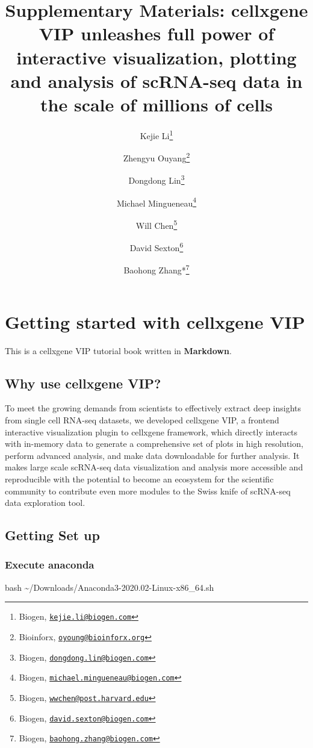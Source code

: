 \documentclass[
]{article}
\title{Supplementary Materials: cellxgene VIP unleashes full power of interactive visualization, plotting and analysis of scRNA-seq data in the scale of millions of cells}
\author{Kejie Li\footnote{Biogen, \href{mailto:kejie.li@biogen.com}{\nolinkurl{kejie.li@biogen.com}}} \and Zhengyu Ouyang\footnote{Bioinforx, \href{mailto:oyoung@bioinforx.org}{\nolinkurl{oyoung@bioinforx.org}}} \and Dongdong Lin\footnote{Biogen, \href{mailto:dongdong.lin@biogen.com}{\nolinkurl{dongdong.lin@biogen.com}}} \and Michael Mingueneau\footnote{Biogen, \href{mailto:michael.mingueneau@biogen.com}{\nolinkurl{michael.mingueneau@biogen.com}}} \and Will Chen\footnote{Biogen, \href{mailto:wwchen@post.harvard.edu}{\nolinkurl{wwchen@post.harvard.edu}}} \and David Sexton\footnote{Biogen, \href{mailto:david.sexton@biogen.com}{\nolinkurl{david.sexton@biogen.com}}} \and Baohong Zhang*\footnote{Biogen, \href{mailto:baohong.zhang@biogen.com}{\nolinkurl{baohong.zhang@biogen.com}}}}
\date{}
\newenvironment{Shaded}{\begin{snugshade}}{\end{snugshade}}
\newcommand{\FunctionTok}[1]{\textcolor[rgb]{0.00,0.00,0.00}{#1}}
\newcommand{\NormalTok}[1]{#1}
\begin{document}
\maketitle

\maketitle

{
\setcounter{tocdepth}{2}
\tableofcontents
}
\hypertarget{getting-started-with-cellxgene-vip}{%
\section{Getting started with cellxgene VIP}\label{getting-started-with-cellxgene-vip}}

This is a cellxgene VIP tutorial book written in \textbf{Markdown}.

\hypertarget{why-use-cellxgene-vip}{%
\subsection{Why use cellxgene VIP?}\label{why-use-cellxgene-vip}}

To meet the growing demands from scientists to effectively extract deep insights from single cell RNA-seq datasets, we developed cellxgene VIP, a frontend interactive visualization plugin to cellxgene framework, which directly interacts with in-memory data to generate a comprehensive set of plots in high resolution, perform advanced analysis, and make data downloadable for further analysis. It makes large scale scRNA-seq data visualization and analysis more accessible and reproducible with the potential to become an ecosystem for the scientific community to contribute even more modules to the Swiss knife of scRNA-seq data exploration tool.

\hypertarget{getting-set-up}{%
\subsection{Getting Set up}\label{getting-set-up}}

\hypertarget{execute-anaconda}{%
\subsubsection{Execute anaconda}\label{execute-anaconda}}

\begin{Shaded}
\begin{Highlighting}[]
\FunctionTok{bash}\NormalTok{ \textasciitilde{}/Downloads/Anaconda3{-}2020.02{-}Linux{-}x86\_64.sh}
\end{Highlighting}
\end{Shaded}
\end{document}
